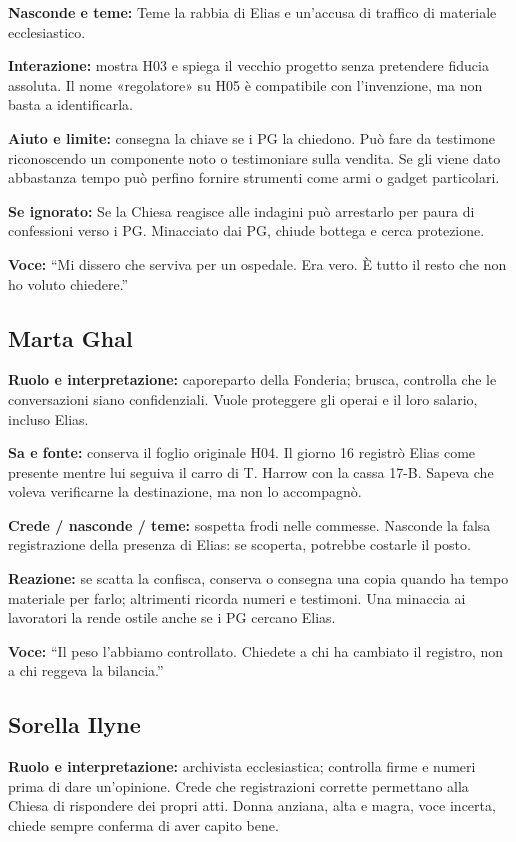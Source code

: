 \documentclass[11pt,a4paper]{article}
\begin{document}
\textbf{Nasconde e teme:} Teme la rabbia di Elias e un'accusa di traffico di materiale ecclesiastico.

\textbf{Interazione:} mostra H03 e spiega il vecchio progetto senza pretendere fiducia assoluta. Il nome «regolatore» su H05 è compatibile con l'invenzione, ma non basta a identificarla.

\textbf{Aiuto e limite:} consegna la chiave se i PG la chiedono. Può fare da testimone riconoscendo un componente noto o testimoniare sulla vendita. Se gli viene dato abbastanza tempo può perfino fornire strumenti come armi o gadget particolari.

\textbf{Se ignorato:} Se la Chiesa reagisce alle indagini può arrestarlo per paura di confessioni verso i PG. Minacciato dai PG, chiude bottega e cerca protezione.
\par
\textbf{Voce:} ``Mi dissero che serviva per un ospedale. Era vero. È tutto il resto che non ho voluto chiedere.''

\subsection{Marta Ghal}
\textbf{Ruolo e interpretazione:} caporeparto della Fonderia; brusca, controlla che le conversazioni siano confidenziali. Vuole proteggere gli operai e il loro salario, incluso Elias.

\textbf{Sa e fonte:} conserva il foglio originale H04. Il giorno 16 registrò Elias come presente mentre lui seguiva il carro di T. Harrow con la cassa 17-B. Sapeva che voleva verificarne la destinazione, ma non lo accompagnò.

\textbf{Crede / nasconde / teme:} sospetta frodi nelle commesse. Nasconde la falsa registrazione della presenza di Elias: se scoperta, potrebbe costarle il posto.

\textbf{Reazione:} se scatta la confisca, conserva o consegna una copia quando ha tempo materiale per farlo; altrimenti ricorda numeri e testimoni. Una minaccia ai lavoratori la rende ostile anche se i PG cercano Elias.\par
\textbf{Voce:} ``Il peso l'abbiamo controllato. Chiedete a chi ha cambiato il registro, non a chi reggeva la bilancia.''

\subsection{Sorella Ilyne}
\textbf{Ruolo e interpretazione:} archivista ecclesiastica; controlla firme e numeri prima di dare un'opinione. Crede che registrazioni corrette permettano alla Chiesa di rispondere dei propri atti. Donna anziana, alta e magra, voce incerta, chiede sempre conferma di aver capito bene. 
\end{document}
